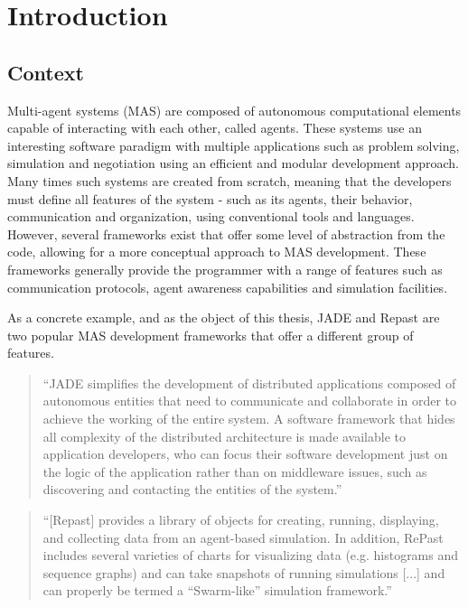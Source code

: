 \chapter{Introduction}
\label{chap:intro}

\section*{}


\section{Context}

Multi-agent systems (MAS) are composed of autonomous computational elements capable of interacting with each other, called agents. \cite{wooldridge2008introduction} These systems use an interesting software paradigm with multiple applications such as problem solving, simulation and negotiation using an efficient and modular development approach. \cite{ferber1999multi}
Many times such systems are created from scratch, meaning that the developers must define all features of the system - such as its agents, their behavior, communication and organization, using conventional tools and
languages. However, several frameworks exist that offer some level of abstraction from the code, allowing for a more conceptual approach to
MAS development. \cite{gormer2011jrep} These frameworks generally provide the programmer with a range of features such as communication protocols, agent awareness capabilities and simulation facilities.

As a concrete example, and as the object of this thesis, JADE and Repast are
two popular MAS development frameworks that offer a different group of
features.

\begin{quote}
	``JADE simplifies the development of distributed applications composed of autonomous entities that need to communicate and collaborate in order to achieve the working of the entire system. A software framework that hides all complexity of the distributed architecture is made available to application developers, who can focus their software development just on the logic of the application rather than on middleware issues, such as discovering and contacting the entities of the system.'' \cite{bellifemine2003jade}
\end{quote}

\begin{quote}
	``[Repast] provides a library of objects for creating, running, displaying, and collecting data from an agent-based simulation. In addition, RePast includes several varieties of charts for visualizing data (e.g. histograms and sequence graphs) and can take snapshots of running simulations [...] and can properly be termed a “Swarm-like” simulation framework.''
	\cite{collier2003repast}
\end{quote}

